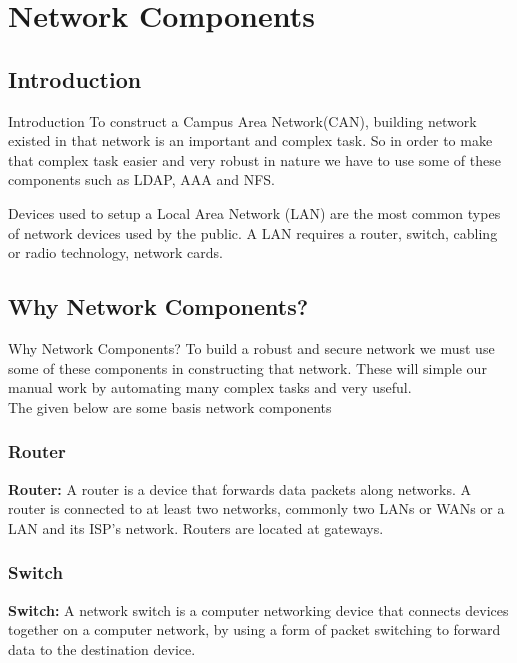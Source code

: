 \documentclass[xcolor=dvipsnames]{beamer}
\begin{document}
\section{Network Components}
\subsection{Introduction}
\begin{frame}{Introduction}
To construct a Campus Area Network(CAN), building network existed in that network is an important and complex task. So in order to make that complex task easier and very robust in nature we have to use some of these components such as LDAP, AAA and NFS.
\newline

Devices used to setup a Local Area Network (LAN) are the most common types of network devices used by the public. A LAN requires a router, switch, cabling or radio technology, network cards.
\end{frame}

\subsection{Why Network Components?}
\begin{frame}{Why Network Components?}
To build a robust and secure network we must use some of these components in constructing that network. These will simple our manual work by automating many complex tasks and very useful.\linebreak \\
The given below are some basis network components\linebreak \\ 

\subsubsection{Router}
\textbf{Router: }
A router is a device that forwards data packets along networks. A router is connected to at least two networks, commonly two LANs or WANs or a LAN and its ISP's network. Routers are located at gateways.\linebreak \\
\subsubsection{Switch}
\textbf{Switch: }
A network switch is a computer networking device that connects devices together on a computer network, by using a form of packet switching to forward data to the destination device.
\end{frame}
\end{document}
